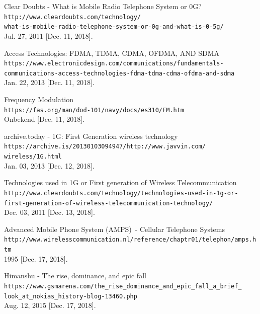 \documentclass{article}
\begin{document}

\begin{thebibliography}{9}

Clear Doubts - What is Mobile Radio Telephone System or 0G?\\
\texttt{http://www.cleardoubts.com/technology/\\what-is-mobile-radio-telephone-system-or-0g-and-what-is-0-5g/} \\Jul. 27, 2011 [Dec. 11, 2018]. 

Access Technologies: FDMA, TDMA, CDMA, OFDMA, AND SDMA  \\
\texttt{https://www.electronicdesign.com/communications/fundamentals-\\communications-access-technologies-fdma-tdma-cdma-ofdma-and-sdma} \\Jan. 22, 2013 [Dec. 11, 2018]. 

Frequency Modulation\\
\texttt{https://fas.org/man/dod-101/navy/docs/es310/FM.htm} \\ Onbekend [Dec. 11, 2018]. 


archive.today - 1G: First Generation wireless technology  \\
\texttt{https://archive.is/20130103094947/http://www.javvin.com/\\wireless/1G.html}\\ Jan. 03, 2013 [Dec. 12, 2018]. 


Technologies used in 1G or First generation of Wireless Telecommunication\\
\texttt{http://www.cleardoubts.com/technology/technologies-used-in-1g-or-\\first-generation-of-wireless-telecommunication-technology/} \\Dec. 03, 2011 [Dec. 13, 2018]. 

Advanced Mobile Phone System (AMPS)\ -  Cellular Telephone Systems\\
\texttt{http://www.wirelesscommunication.nl/reference/chaptr01/telephon/amps.htm} \\1995 [Dec. 17, 2018]. 

Himanshu - The rise, dominance, and epic fall\\
\texttt{https://www.gsmarena.com/the\_rise\_dominance\_and\_epic\_fall\_a\_brief\_\\look\_at\_nokias\_history-blog-13460.php} \\Aug. 12, 2015 [Dec. 17, 2018]. 


\end{thebibliography}
\end{document}
